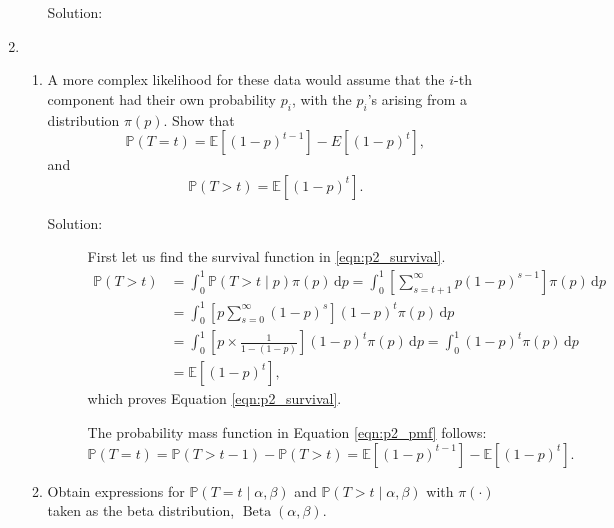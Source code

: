 \documentclass[letterpaper,11pt]{article}
\begin{document}
\begin{enumerate}
\begin{enumerate}
    \begin{description}
    \item[Solution:] 
    \end{description}
  \end{enumerate}
\item
  \begin{enumerate}
  \item A more complex likelihood for these data would assume that the $i$-th
    component had their own probability $p_i$, with the $p_i$'s arising from a
    distribution $\pi\left(p\right)$. Show that
      \begin{equation}
        \mathbb{P}\left(T = t\right) =
        \mathbb{E}\left[(1 - p)^{t-1}\right] -
        E[(1 - p)^t],
        \label{eqn:p2_pmf}
      \end{equation}
      and
      \begin{equation}
        \mathbb{P}\left(T > t\right) = \mathbb{E}\left[(1 - p)^t\right].
        \label{eqn:p2_survival}
      \end{equation}
      \begin{description}
      \item[Solution:] First let us find the survival function in
        \ref{eqn:p2_survival}.
        \begin{align*}
          \mathbb{P}\left(T > t\right)
          &= \int_0^1
          \mathbb{P}\left(T > t \mid p\right)
          \pi\left(p\right)\,\mathrm{d}p 
          = \int_0^1 \left[\sum_{s=t + 1}^\infty p(1 - p)^{s-1}\right]
            \pi\left(p\right)
          \,\mathrm{d}p \\
          &= \int_0^1 \left[p\sum_{s=0}^\infty (1 - p)^s\right]
            (1 - p)^t
            \pi\left(p\right)
            \,\mathrm{d}p \\
          &= \int_0^1 \left[p \times \frac{1}{1 - (1-p)}\right]
            (1 - p)^t
            \pi\left(p\right)
            \,\mathrm{d}p
          = \int_0^1 (1 - p)^t
            \pi\left(p\right)
            \,\mathrm{d}p \\
          &= \mathbb{E}\left[\left(1-p\right)^t\right],
        \end{align*}
        which proves Equation \ref{eqn:p2_survival}.

        The probability mass function in Equation \ref{eqn:p2_pmf} follows:
        \begin{equation*}
          \mathbb{P}\left(T = t\right)
          = \mathbb{P}\left(T > t - 1\right)
          - \mathbb{P}\left(T > t\right)
          = \mathbb{E}\left[\left(1-p\right)^{t-1}\right]
          - \mathbb{E}\left[\left(1-p\right)^{t}\right].
        \end{equation*}
      \end{description}
    \item Obtain expressions for
      $\mathbb{P}\left(T = t \mid \alpha, \beta\right)$ and
      $\mathbb{P}\left(T > t \mid \alpha, \beta\right)$ with
      $\pi\left(\cdot\right)$ taken as the beta distribution,
      $\operatorname{Beta}\left(\alpha, \beta\right)$.


\end{enumerate}
\end{enumerate}
\end{document}
